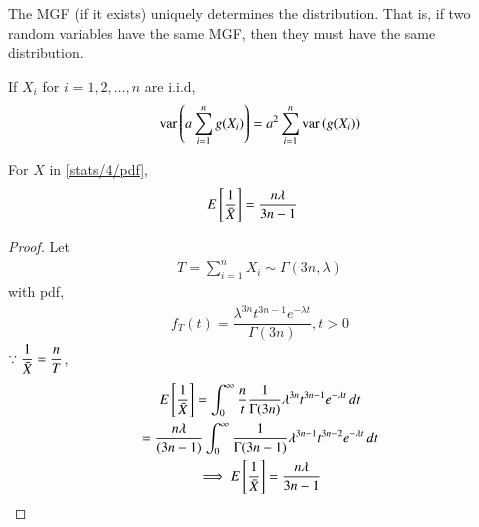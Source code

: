     \begin{theorem}
    \label{stats/4/mgf}
     The MGF (if it exists) uniquely determines the distribution. That is, if two random variables have the same MGF, then they must have the same distribution. 
    \end{theorem}
    \begin{lemma}
    \label{stats/4/var}
    If $X_{i}$ for $i = 1,2,\dots,n$ are i.i.d,
       \begin{align}
        \text{var}\left( a\sum_{i=1}^{n}g(X_{i}) \right)=a^2 \sum_{i=1}^{n}\text{var}\left( g(X_{i}) \right)\label{stats/4/basic}
        \end{align}
    \end{lemma}
    \begin{lemma}
        \label{stats/4/expected}
        For $X$ in \eqref{stats/4/pdf},
        \begin{align}
                E \left[  \dfrac{1}{\Bar{X}}  \right] &= \dfrac{n\lambda}{3n-1}
        \end{align}
        \end{lemma}
        \begin{proof}
        Let 
        \begin{align}
            T = \sum_{i=1}^{n} X_i \sim \Gamma(3n, \lambda)
        \end{align}
        with pdf,
        \begin{align}
            f_T(t)= \dfrac{\lambda^{3n} t^{3n-1}e^{-\lambda t}}{\Gamma(3n)} , t>0
        \end{align}
         $ \because \dfrac{1}{\Bar{X}} = \dfrac{n}{T}$,
        \begin{multline}
            E \left[   \dfrac{1}{\Bar{X}}  \right] =  \int_{0}^{\infty} \dfrac{n}{t} \dfrac{1}{\Gamma(3n)} \lambda^{3n}t^{3n-1}e^{-\lambda t}\,dt \\
            = \dfrac{n\lambda}{(3n-1)} \int_{0}^{\infty}  \dfrac{1}{\Gamma(3n-1)} \lambda^{3n-1}t^{3n-2}e^{-\lambda t}\,dt \\
\implies            E \left[  \dfrac{1}{\Bar{X}}  \right] = \dfrac{n\lambda}{3n-1}
        \end{multline}
        \end{proof}
